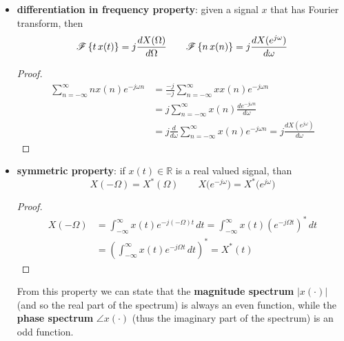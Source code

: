 \begin{itemize}
		\item \textbf{differentiation in frequency property}: given a signal $x$ that has Fourier transform, then
		\[\mathscr{F}\left\{ t\, x(t) \right\} = j \frac{d X(\Omega)}{d\Omega} \qquad \mathscr{F}\left\{ n \, x(n) \right\} = j \frac{dX(e^{j\omega})}{d\omega} \]
		
		\begin{proof}
		\begin{align*}
			\sum_{n=-\infty}^\infty n x(n) e^{-j\omega n} & = \frac{-j}{-j}\sum_{n=-\infty}^\infty x x(n) e^{-j\omega n} \\
			& = j \sum_{n=-\infty}^\infty x(n) \frac{de^{-j\omega n}}{d\omega} \\
			& = j \frac{d}{d\omega}\sum_{n=-\infty}^\infty x(n) e^{-j\omega n} = j \frac{dX(e^{j\omega})}{d\omega}
		\end{align*}
		\end{proof}
		
		\item \textbf{symmetric property}: if $x(t)\in \mathds R$ is a real valued signal, than
		\[ X(-\Omega) = X^*(\Omega) \qquad X\big(e^{-j\omega}\big) = X^*\big(e^{j\omega}\big) \]
		\begin{proof}
		\begin{align*}
			X(-\Omega) & = \int_{-\infty}^\infty x(t) e^{-j (-\Omega) t} \, dt = \int_{-\infty}^\infty x(t) \left(e^{-j\Omega t}\right)^* \, dt \\ 
			& = \left( \int_{-\infty}^\infty x(t) e^{-j\Omega t} \, dt\right)^* = X^*(t)
		\end{align*}
		\end{proof}
		From this property we can state that the \textbf{magnitude spectrum} $|x(\cdot)|$ (and so the real part of the spectrum) is always an even function, while the \textbf{phase spectrum} $\angle x(\cdot)$ (thus the imaginary part of the spectrum) is an odd function. \vspace{3mm}
		

\end{itemize}
